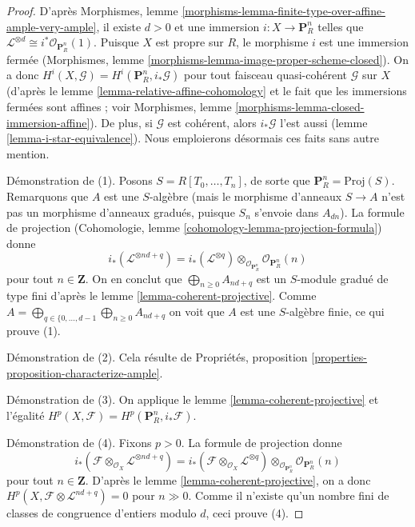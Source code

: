 \begin{proof}
D'après
Morphismes, lemme \ref{morphisms-lemma-finite-type-over-affine-ample-very-ample},
il existe $d > 0$ et une immersion $i : X \to \mathbf{P}^n_R$
telles que $\mathcal{L}^{\otimes d} \cong i^*\mathcal{O}_{\mathbf{P}^n_R}(1)$.
Puisque $X$ est propre sur $R$, le morphisme $i$ est une immersion fermée
(Morphismes, lemme \ref{morphisms-lemma-image-proper-scheme-closed}).
On a donc $H^i(X, \mathcal{G}) = H^i(\mathbf{P}^n_R, i_*\mathcal{G})$
pour tout faisceau quasi-cohérent $\mathcal{G}$ sur $X$
(d'après le lemme \ref{lemma-relative-affine-cohomology} et le fait que les
immersions fermées sont affines ; voir
Morphismes, lemme \ref{morphisms-lemma-closed-immersion-affine}).
De plus, si $\mathcal{G}$ est cohérent, alors $i_*\mathcal{G}$
l'est aussi (lemme \ref{lemma-i-star-equivalence}).
Nous emploierons désormais ces faits sans autre mention.

\medskip\noindent
Démonstration de (1). Posons $S = R[T_0, \ldots, T_n]$, de sorte que
$\mathbf{P}^n_R = \text{Proj}(S)$.
Remarquons que $A$ est une $S$-algèbre (mais le morphisme d'anneaux $S \to A$ n'est pas
un morphisme d'anneaux gradués, puisque $S_n$ s'envoie dans $A_{dn}$).
La formule de projection
(Cohomologie, lemme \ref{cohomology-lemma-projection-formula})
donne
$$
i_*(\mathcal{L}^{\otimes nd + q}) =
i_*(\mathcal{L}^{\otimes q})
\otimes_{\mathcal{O}_{\mathbf{P}^n_R}}
\mathcal{O}_{\mathbf{P}^n_R}(n)
$$
pour tout $n \in \mathbf{Z}$. On en conclut que $\bigoplus_{n \geq 0} A_{nd + q}$
est un $S$-module gradué de type fini d'après le lemme \ref{lemma-coherent-projective}.
Comme
$A = \bigoplus_{q \in \{0, \ldots, d - 1} \bigoplus_{n \geq 0} A_{nd + q}$
on voit que $A$ est une $S$-algèbre finie, ce qui prouve (1).

\medskip\noindent
Démonstration de (2). Cela résulte de
Propriétés, proposition \ref{properties-proposition-characterize-ample}.

\medskip\noindent
Démonstration de (3). On applique le lemme \ref{lemma-coherent-projective}
et l'égalité $H^p(X, \mathcal{F}) = H^p(\mathbf{P}^n_R, i_*\mathcal{F})$.

\medskip\noindent
Démonstration de (4). Fixons $p > 0$. La formule de projection donne
$$
i_*(\mathcal{F} \otimes_{\mathcal{O}_X} \mathcal{L}^{\otimes nd + q}) =
i_*(\mathcal{F} \otimes_{\mathcal{O}_X} \mathcal{L}^{\otimes q})
\otimes_{\mathcal{O}_{\mathbf{P}^n_R}}
\mathcal{O}_{\mathbf{P}^n_R}(n)
$$
pour tout $n \in \mathbf{Z}$. D'après le lemme \ref{lemma-coherent-projective},
on a donc $H^p(X, \mathcal{F} \otimes \mathcal{L}^{nd + q}) = 0$
pour $n \gg 0$. Comme il n'existe qu'un nombre fini de classes de
congruence d'entiers modulo $d$, ceci prouve (4).


\end{proof}
